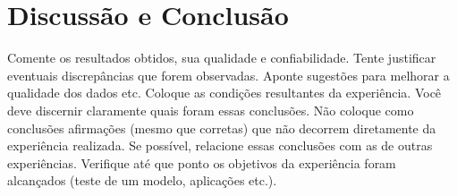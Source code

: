 \newpage
\section{Discussão e Conclusão}
Comente os resultados obtidos, sua qualidade e confiabilidade. Tente justificar eventuais discrepâncias que forem observadas. Aponte sugestões para melhorar a qualidade dos dados etc. Coloque as condições resultantes da experiência. Você deve discernir claramente quais foram essas conclusões. Não coloque como conclusões afirmações (mesmo que corretas) que não decorrem diretamente da experiência realizada. Se possível, relacione essas conclusões com as de outras experiências. Verifique até que ponto os objetivos da experiência foram alcançados (teste de um modelo, aplicações etc.).